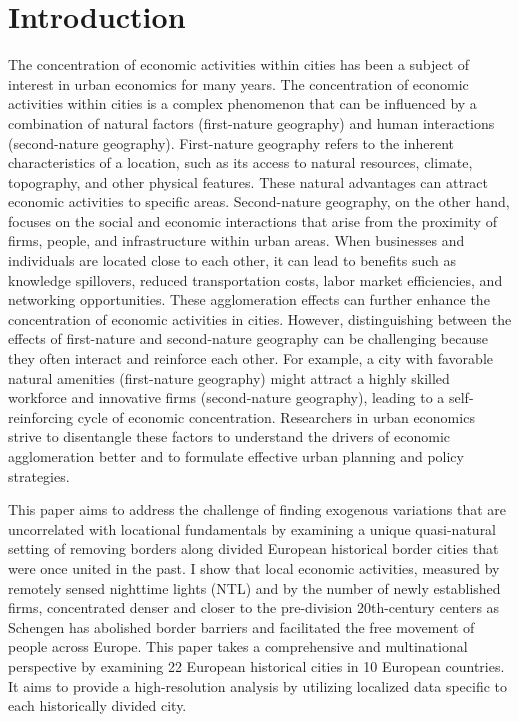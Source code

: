 \documentclass[12pt]{article}    %
\begin{document}
\newpage

\section{Introduction}
\par The concentration of economic activities within cities has been a subject of interest in urban economics for many years. The concentration of economic activities within cities is a complex phenomenon that can be influenced by a combination of natural factors (first-nature geography) and human interactions (second-nature geography). First-nature geography refers to the inherent characteristics of a location, such as its access to natural resources, climate, topography, and other physical features. These natural advantages can attract economic activities to specific areas. Second-nature geography, on the other hand, focuses on the social and economic interactions that arise from the proximity of firms, people, and infrastructure within urban areas. When businesses and individuals are located close to each other, it can lead to benefits such as knowledge spillovers, reduced transportation costs, labor market efficiencies, and networking opportunities. These agglomeration effects can further enhance the concentration of economic activities in cities. However, distinguishing between the effects of first-nature and second-nature geography can be challenging because they often interact and reinforce each other. For example, a city with favorable natural amenities (first-nature geography) might attract a highly skilled workforce and innovative firms (second-nature geography), leading to a self-reinforcing cycle of economic concentration. Researchers in urban economics strive to disentangle these factors to understand the drivers of economic agglomeration better and to formulate effective urban planning and policy strategies. 

\par This paper aims to address the challenge of finding exogenous variations that are uncorrelated with locational fundamentals by examining a unique quasi-natural setting of removing borders along divided European historical border cities that were once united in the past. I show that local economic activities, measured by remotely sensed nighttime lights (NTL) and by the number of newly established firms, concentrated denser and closer to the pre-division 20th-century centers as Schengen has abolished border barriers and facilitated the free movement of people across Europe. This paper
takes a comprehensive and multinational perspective by examining 22 European historical cities in 10 European countries. It aims to provide a high-resolution analysis by utilizing localized data specific to each historically divided city.
 
\end{document}
